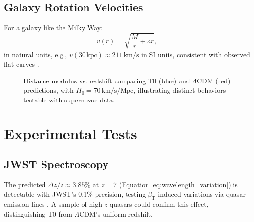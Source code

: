 \documentclass[12pt,a4paper]{article}
\newcommand{\betaT}{\beta_{\text{T}}}
\begin{document}
	\subsection{Galaxy Rotation Velocities}
	\label{subsec:rotation_velocity_prediction}
For a galaxy like the Milky Way:
\begin{equation}
	v(r) = \sqrt{\frac{M}{r} + \kappa r},
	\label{eq:rotation_velocity_repeat}
\end{equation}
in natural units, e.g., \(v(30 \, \text{kpc}) \approx 211 \, \text{km/s}\) in SI units, consistent with observed flat curves \cite{McGaugh2016}.
	
	\begin{figure}[ht]
		\centering
		\caption{Distance modulus vs. redshift comparing T0 (blue) and \(\Lambda\)CDM (red) predictions, with \(H_0 = 70 \, \text{km/s/Mpc}\), illustrating distinct behaviors testable with supernovae data.}
		\label{fig:distance_modulus}
	\end{figure}
	
	\section{Experimental Tests}
	\label{sec:tests}
	
	\subsection{JWST Spectroscopy}
	\label{subsec:jwst_test}
	
	The predicted \(\Delta z / z \approx 3.85\%\) at \(z = 7\) (Equation \ref{eq:wavelength_variation}) is detectable with JWST’s \(0.1\%\) precision, testing \(\betaT\)-induced variations via quasar emission lines \cite{pascher_params_2025}. A sample of high-\(z\) quasars could confirm this effect, distinguishing T0 from \(\Lambda\)CDM’s uniform redshift.
	
\end{document}
